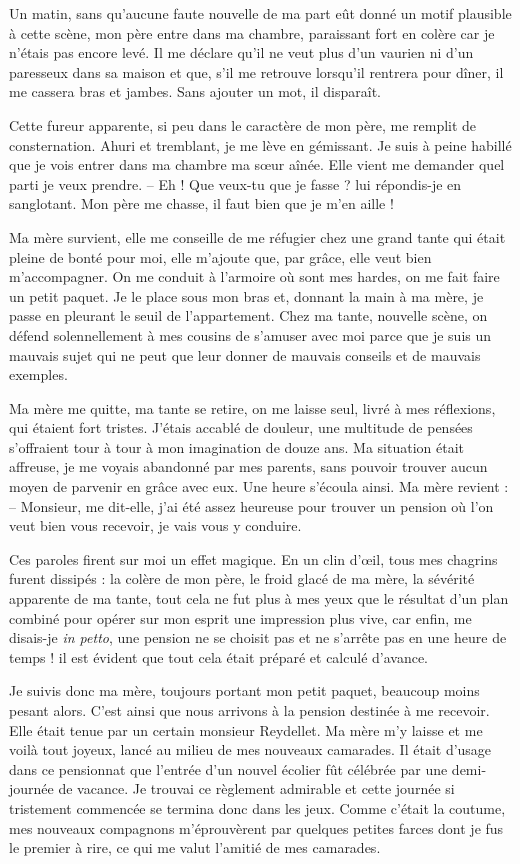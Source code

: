 \documentclass[11pt,a4paper]{report}
\begin{document}
Un matin, sans qu'aucune faute nouvelle de ma part eût donné un motif plausible à cette scène, mon père entre dans ma chambre, paraissant fort en colère car je n'étais pas encore levé. Il me déclare qu'il ne veut plus d'un vaurien ni d'un paresseux dans sa maison et que, s'il me retrouve lorsqu'il rentrera pour dîner, il me cassera bras et jambes. Sans ajouter un mot, il disparaît.

Cette fureur apparente, si peu dans le caractère de mon père, me remplit de consternation. Ahuri et tremblant, je me lève en gémissant. Je suis à peine habillé que je vois entrer dans ma chambre ma sœur aînée. Elle vient me demander quel parti je veux prendre.
-- Eh ! Que veux-tu que je fasse ? lui répondis-je en sanglotant. Mon père me chasse, il faut bien que je m'en aille !

Ma mère survient, elle me conseille de me réfugier chez une grand tante qui était pleine de bonté pour moi, elle m'ajoute que, par grâce, elle veut bien m'accompagner. On me conduit à l'armoire où sont mes hardes, on me fait faire un petit paquet. Je le place sous mon bras et, donnant la main à ma mère, je passe en pleurant le seuil de l'appartement. Chez ma tante, nouvelle scène, on défend solennellement à mes cousins de s'amuser avec moi parce que je suis un mauvais sujet qui ne peut que leur donner de mauvais conseils et de mauvais exemples.

Ma mère me quitte, ma tante se retire, on me laisse seul, livré à mes réflexions, qui étaient fort tristes. J'étais accablé de douleur, une multitude de pensées s'offraient tour à tour à mon imagination de douze ans. Ma situation était affreuse, je me voyais abandonné par mes parents, sans pouvoir trouver aucun moyen de parvenir en grâce avec eux. Une heure s'écoula ainsi. Ma mère revient :
-- Monsieur, me dit-elle, j'ai été assez heureuse pour trouver un pension où l'on veut bien vous recevoir, je vais vous y conduire.

Ces paroles firent sur moi un effet magique. En un clin d'œil, tous mes chagrins furent dissipés : la colère de mon père, le froid glacé de ma mère, la sévérité apparente de ma tante, tout cela ne fut plus à mes yeux que le résultat d'un plan combiné pour opérer sur mon esprit une impression plus vive, car enfin, me disais-je \textit{in petto}, une pension ne se choisit pas et ne s'arrête pas en une heure de temps ! il est évident que tout cela était préparé et calculé d'avance.

Je suivis donc ma mère, toujours portant mon petit paquet, beaucoup moins pesant alors. C'est ainsi que nous arrivons à la pension destinée à me recevoir. Elle était tenue par un certain monsieur Reydellet. Ma mère m'y laisse et me voilà tout joyeux, lancé au milieu de mes nouveaux camarades. Il était d'usage dans ce pensionnat que l'entrée d'un nouvel écolier fût célébrée par une demi-journée de vacance. Je trouvai ce règlement admirable et cette journée si tristement commencée se termina donc dans les jeux. Comme c'était la coutume, mes nouveaux compagnons m'éprouvèrent par quelques petites farces dont je fus le premier à rire, ce qui me valut l'amitié de mes camarades.
\end{document}
